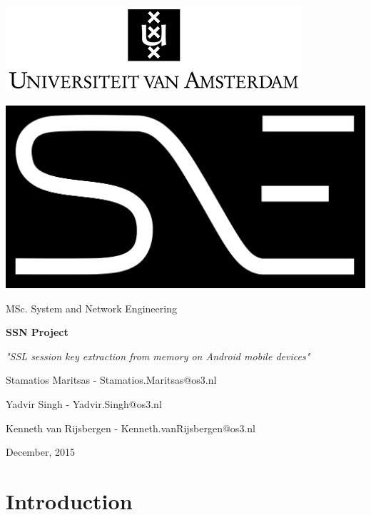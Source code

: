 \documentclass[12pt, a4paper]{report}
\begin{document}
\begin{center}
\includegraphics[scale=0.6]{images/logo-uva.png}
\vspace{30pt}

\includegraphics[scale=0.2]{images/logo-sne_black-inv-flat}
\vspace{10pt}

\Large MSc. System and Network Engineering
\vspace{100pt}

\textbf{\huge SSN Project}
\vspace{10pt}

\textit{\Large "SSL session key extraction from memory on Android mobile devices"}
\vspace{80pt}

\large Stamatios Maritsas - Stamatios.Maritsas@os3.nl

\large Yadvir Singh - Yadvir.Singh@os3.nl

\large Kenneth van Rijsbergen - Kenneth.vanRijsbergen@os3.nl
\vspace{80pt}

\normalsize December, 2015
\end{center}


\tableofcontents
\listoffigures
\listoftables

\chapter{Introduction}
\end{document}
